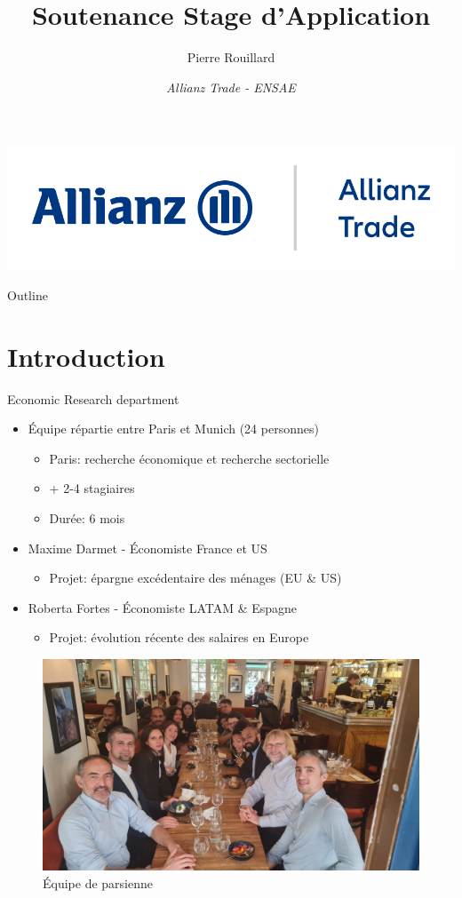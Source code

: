 \documentclass[9pt, xcolor={dvipsnames}]{beamer}
\author{Pierre Rouillard}
\title{Soutenance Stage d'Application}
\institute{Maître de stage: Françoise Huang \\ 30/01/2024}
\date{\textit{Allianz Trade - ENSAE}}
\begin{document}
\begin{frame}[plain]
\titlepage
\centering
\includegraphics[width=.5\textwidth]{Allianz_Trade.png}
\end{frame}

\begin{frame}{Outline}
  \tableofcontents
\end{frame}

\section{Introduction}
\begin{frame}[label=intro]{Economic Research department}
\begin{itemize}
\item Équipe répartie entre Paris et Munich (24 personnes)\\
   \begin{itemize}
    \item Paris: recherche économique et recherche sectorielle
    \item + 2-4 stagiaires
    \item Durée: 6 mois
   \end{itemize}
\item Maxime Darmet - Économiste France et US
  \begin{itemize}
    \item Projet: épargne excédentaire des ménages (EU \& US)
  \end{itemize}
\item Roberta Fortes - Économiste LATAM \& Espagne
  \begin{itemize}
    \item Projet: évolution récente des salaires en Europe
  \end{itemize}
\end{itemize}
\begin{figure}
  \centering
  \includegraphics[width=.6\textwidth]{img/team.JPG}
  \caption{Équipe de parsienne}
\end{figure}
\end{frame}
\end{document}
